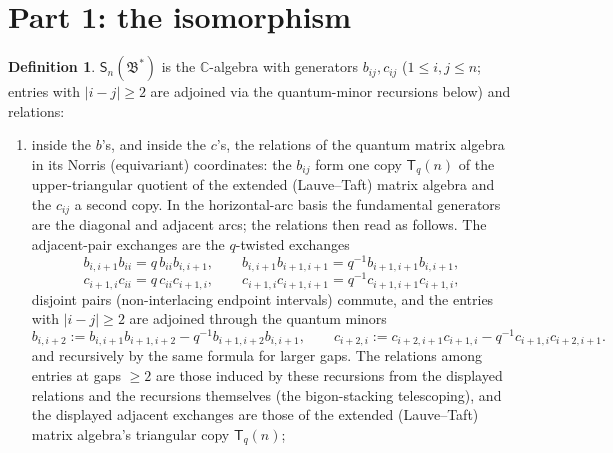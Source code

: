 \documentclass[11pt]{article}
\theoremstyle{definition}
\newtheorem{definition}[theorem]{Definition}
\theoremstyle{remark}
\newcommand{\C}{\mathbb{C}}
\newcommand{\B}{\mathfrak{B}}
\newcommand{\Sn}{\mathsf{S}_n}
\newcommand{\coloneqq}{\mathrel{:=}}
\begin{document}
\section{Part 1: the isomorphism}\label{sec:p1}
\begin{definition}\label{def:A}
$\Sn(\B^*)$ is the $\C$-algebra with generators $b_{ij},c_{ij}$
($1\le i,j\le n$; entries with $|i-j|\ge2$ are adjoined via the
quantum-minor recursions below) and relations:
\begin{enumerate}[label=(\Alph*),leftmargin=2.2em]
\item\label{relAA} inside the $b$'s, and inside the $c$'s, the
  relations of the quantum matrix algebra in its Norris (equivariant)
  coordinates: the $b_{ij}$ form one copy $\mathsf T_q(n)$ of the
  upper-triangular quotient of the extended (Lauve--Taft) matrix
  algebra and the $c_{ij}$ a second copy.
  In the horizontal-arc basis the fundamental generators are the
  diagonal and adjacent arcs; the relations then read as follows.
  The adjacent-pair exchanges are the $q$-twisted exchanges
  \[
  b_{i,i+1}b_{ii}=q\,b_{ii}b_{i,i+1},\qquad
  b_{i,i+1}b_{i+1,i+1}=q^{-1}b_{i+1,i+1}b_{i,i+1},
  \]
  \[
  c_{i+1,i}c_{ii}=q\,c_{ii}c_{i+1,i},\qquad
  c_{i+1,i}c_{i+1,i+1}=q^{-1}c_{i+1,i+1}c_{i+1,i},
  \]
  disjoint pairs (non-interlacing endpoint intervals) commute, and
  the entries with $|i-j|\ge2$ are adjoined through the quantum
  minors
  \begin{equation}
  b_{i,i+2}\coloneqq b_{i,i+1}b_{i+1,i+2}-q^{-1}b_{i+1,i+2}b_{i,i+1},
  \qquad
  c_{i+2,i}\coloneqq c_{i+2,i+1}c_{i+1,i}-q^{-1}c_{i+1,i}c_{i+2,i+1}.
  \label{qmin}\tag{q-min}
  \end{equation}
  and recursively by the same formula for larger gaps.  The
  relations among entries at gaps $\ge2$ are those induced by these
  recursions from the displayed relations and the recursions
  themselves (the bigon-stacking telescoping), and the displayed
  adjacent exchanges are those of the extended (Lauve--Taft) matrix
  algebra's triangular copy $\mathsf T_q(n)$;

\end{enumerate}
\end{definition}
\end{document}
